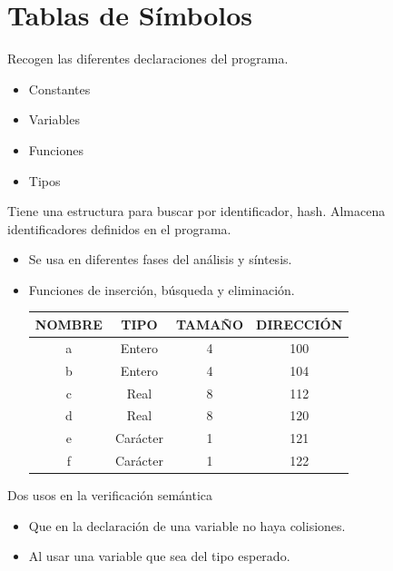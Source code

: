 \documentclass[12pt, twoside, openright]{report} %
\begin{document}
\section{Tablas de Símbolos}
Recogen las diferentes declaraciones del programa.
\begin{itemize}
  \item Constantes
  \item Variables
  \item Funciones
  \item Tipos
\end{itemize}

Tiene una estructura para buscar por identificador, hash. Almacena identificadores definidos en el programa.
\begin{itemize}
  \item Se usa en diferentes fases del análisis y síntesis.
  \item Funciones de inserción, búsqueda y eliminación.

\begin{table}[h]
    \begin{tabular}{|c|c|c|c|}
    \hline
    \textbf{NOMBRE} & \textbf{TIPO} & \textbf{TAMAÑO} & \textbf{DIRECCIÓN} \\ \hline
    a               & Entero        & 4               & 100                \\ \hline
    b               & Entero        & 4               & 104                \\ \hline
    c               & Real          & 8               & 112                \\ \hline
    d               & Real          & 8               & 120                \\ \hline
    e               & Carácter      & 1               & 121                \\ \hline
    f               & Carácter      & 1               & 122                \\ \hline
    \end{tabular}
\end{table}
\end{itemize}
\pagebreak
Dos usos en la verificación semántica
\begin{itemize}
  \item Que en la declaración de una variable no haya colisiones.
  \item Al usar una variable que sea del tipo esperado.
\end{itemize}
\end{document}
